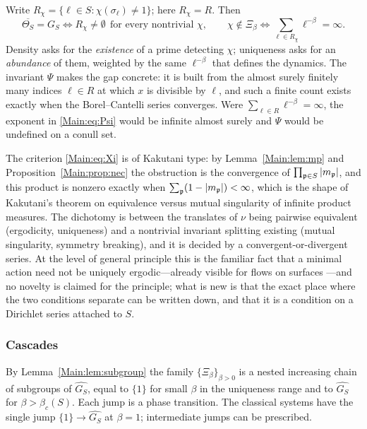 \begin{remark}\label{Main:rem:parting}
Write $R_\chi=\{\ell\in S:\chi(\sigma_\ell)\neq1\}$; here $R_\chi=R$. Then
\[
\overline{\Theta_S}=G_S\iff R_\chi\neq\emptyset\ \ \text{for every nontrivial }\chi,
\qquad
\chi\notin\Xi_\beta\iff\sum_{\ell\in R_\chi}\ell^{-\beta}=\infty .
\]
Density asks for the \emph{existence} of a prime detecting $\chi$; uniqueness
asks for an \emph{abundance} of them, weighted by the same $\ell^{-\beta}$ that
defines the dynamics. The invariant $\Psi$ makes the gap concrete: it is built
from the almost surely finitely many indices $\ell\in R$ at which $x$ is
divisible by $\ell$, and such a finite count exists exactly when the
Borel--Cantelli series converges. Were $\sum_{\ell\in R}\ell^{-\beta}=\infty$,
the exponent in \eqref{Main:eq:Psi} would be infinite almost surely and $\Psi$ would
be undefined on a conull set.
\end{remark}

\begin{remark}\label{Main:rem:kakutani}
The criterion \eqref{Main:eq:Xi} is of Kakutani type: by Lemma~\ref{Main:lem:mp} and
Proposition~\ref{Main:prop:nec} the obstruction is the convergence of
$\prod_{\mathfrak{p}\in S}|m_{\mathfrak{p}}|$, and this product is nonzero exactly when
$\sum_{\mathfrak{p}}(1-|m_{\mathfrak{p}}|)<\infty$, which is the shape of Kakutani's theorem on
equivalence versus mutual singularity of infinite product measures. The
dichotomy is between the translates of $\nu$ being pairwise equivalent
(ergodicity, uniqueness) and a nontrivial invariant splitting existing (mutual
singularity, symmetry breaking), and it is decided by a convergent-or-divergent
series. At the level of general principle this is the familiar fact that a
minimal action need not be uniquely ergodic---already visible for flows on
surfaces \cite{Fur}---and no novelty is claimed for the principle; what is new
is that the exact place where the two conditions separate can be written down,
and that it is a condition on a Dirichlet series attached to $S$.
\end{remark}

\subsubsection*{Cascades}

By Lemma~\ref{Main:lem:subgroup} the family $\{\Xi_\beta\}_{\beta>0}$ is a nested
increasing chain of subgroups of $\widehat{G_S}$, equal to $\{1\}$ for small
$\beta$ in the uniqueness range and to $\widehat{G_S}$ for
$\beta>\beta_c(S)$. Each jump is a phase transition. The classical systems have
the single jump $\{1\}\to\widehat{G_S}$ at $\beta=1$; intermediate jumps can be
prescribed.

